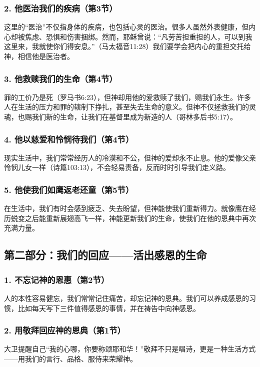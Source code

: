 \documentclass[a4paper, 12pt]{article}
\begin{document}
\subsubsection*{2. 他医治我们的疾病（第3节）}
这里的“医治”不仅指身体的疾病，也包括心灵的医治。很多人虽然外表健康，但内心却被焦虑、恐惧和伤害捆绑。然而，耶稣曾说：“凡劳苦担重担的人，可以到我这里来，我就使你们得安息。”（马太福音11:28）我们要学会把内心的重担交托给神，相信他是医治者。

\subsubsection*{3. 他救赎我们的生命（第4节）}
罪的工价乃是死（罗马书6:23），但神却用他的爱救赎了我们，赐我们永生。许多人在生活的压力和罪的辖制下挣扎，甚至失去生命的意义。但神不仅拯救我们的灵魂，也赐我们新的生命，让我们在基督里成为新造的人（哥林多后书5:17）。

\subsubsection*{4. 他以慈爱和怜悯待我们（第4节）}
现实生活中，我们常常经历人的冷漠和不公，但神的爱却永不止息。他的爱像父亲怜悯儿女一样（诗篇103:13），不会轻易责备，反而时时引导我们走义路。

\subsubsection*{5. 他使我们如鹰返老还童（第5节）}
在生活中，我们有时会感到疲乏、失去盼望，但神能使我们重新得力。就像鹰在经历蜕变之后能重新展翅高飞一样，神能更新我们的生命，使我们在他的恩典中再次充满力量。

\subsection*{第二部分：我们的回应——活出感恩的生命}

\subsubsection*{1. 不忘记神的恩惠（第2节）}
人的本性容易健忘，我们常常记住痛苦，却忘记神的恩典。我们可以养成感恩的习惯，比如每天写下三件值得感恩的事情，并在祷告中向神感恩。

\subsubsection*{2. 用敬拜回应神的恩典（第1节）}
大卫提醒自己“我的心哪，你要称颂耶和华！”敬拜不只是唱诗，更是一种生活方式——用我们的言行、品格、服侍来荣耀神。
\end{document}
